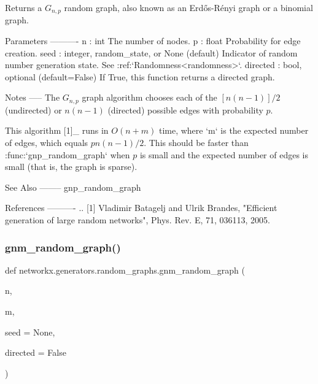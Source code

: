 \begin{DoxyVerb}Returns a $G_{n,p}$ random graph, also known as an Erdős-Rényi graph or
a binomial graph.

Parameters
----------
n : int
    The number of nodes.
p : float
    Probability for edge creation.
seed : integer, random_state, or None (default)
    Indicator of random number generation state.
    See :ref:`Randomness<randomness>`.
directed : bool, optional (default=False)
    If True, this function returns a directed graph.

Notes
-----
The $G_{n,p}$ graph algorithm chooses each of the $[n (n - 1)] / 2$
(undirected) or $n (n - 1)$ (directed) possible edges with probability $p$.

This algorithm [1]_ runs in $O(n + m)$ time, where `m` is the expected number of
edges, which equals $p n (n - 1) / 2$. This should be faster than
:func:`gnp_random_graph` when $p$ is small and the expected number of edges
is small (that is, the graph is sparse).

See Also
--------
gnp_random_graph

References
----------
.. [1] Vladimir Batagelj and Ulrik Brandes,
   "Efficient generation of large random networks",
   Phys. Rev. E, 71, 036113, 2005.
\end{DoxyVerb}
 \mbox{\label{namespacenetworkx_1_1generators_1_1random__graphs_acd29115caef5388f11b7355b35d55815}} 
\subsubsection{\texorpdfstring{gnm\+\_\+random\+\_\+graph()}{gnm\_random\_graph()}}
{\footnotesize\ttfamily def networkx.\+generators.\+random\+\_\+graphs.\+gnm\+\_\+random\+\_\+graph (\begin{DoxyParamCaption}\item[{}]{n,  }\item[{}]{m,  }\item[{}]{seed = {\ttfamily None},  }\item[{}]{directed = {\ttfamily False} }\end{DoxyParamCaption})}

